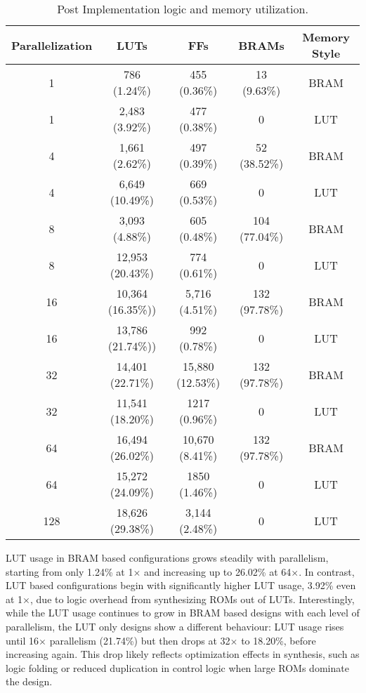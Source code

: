 \documentclass[a4paper,12pt]{report}
\begin{document}
\begin{table}[H]
\centering
\renewcommand{\arraystretch}{1.2}
\begin{tabular}{|c|c|c|c|c|}
\hline
\textbf{Parallelization} & \textbf{LUTs} & \textbf{FFs} & \textbf{BRAMs} & \textbf{Memory Style} \\
    \hline
    1   & 786 (1.24\%) & 455 (0.36\%) & 13 (9.63\%)  & BRAM \\
    \hline
    1   & 2,483 (3.92\%) & 477 (0.38\%) & 0  & LUT \\
    \hline
    4   & 1,661 (2.62\%)  & 497 (0.39\%)  & 52 (38.52\%)  & BRAM \\
    \hline
    4   & 6,649 (10.49\%)  & 669 (0.53\%)  & 0 & LUT \\
    \hline
    8   & 3,093 (4.88\%)  & 605 (0.48\%)  & 104 (77.04\%) & BRAM \\
    \hline
    8   & 12,953 (20.43\%)  & 774 (0.61\%)  & 0 & LUT \\
    \hline
    16  & 10,364 (16.35\%)) & 5,716 (4.51\%) & 132 (97.78\%)  & BRAM \\
    \hline
    16  & 13,786 (21.74\%)) & 992 (0.78\%) & 0  & LUT \\
    \hline
    32  & 14,401 (22.71\%) & 15,880 (12.53\%) & 132 (97.78\%) & BRAM \\
    \hline
    32  & 11,541 (18.20\%) & 1217 (0.96\%) & 0 & LUT \\
    \hline
    64  & 16,494 (26.02\%) & 10,670 (8.41\%) & 132 (97.78\%) & BRAM \\
    \hline
    64  & 15,272 (24.09\%) & 1850 (1.46\%) & 0 & LUT \\
    \hline
    128 & 18,626 (29.38\%) & 3,144 (2.48\%) & 0   & LUT \\
    \hline
\end{tabular}
\vspace{1em}
\caption{Post Implementation logic and memory utilization.}
\label{table:resource_utilization_comparison}
\end{table}

LUT usage in BRAM based configurations grows steadily with parallelism, starting from only 1.24\% at 1$\times$ and increasing up to 26.02\% at 64$\times$. In contrast, LUT based configurations begin with significantly higher LUT usage, 3.92\% even at 1$\times$, due to logic overhead from synthesizing ROMs out of LUTs. Interestingly, while the LUT usage continues to grow in BRAM based designs with each level of parallelism, the LUT only designs show a different behaviour: LUT usage rises until 16$\times$ parallelism (21.74\%) but then drops at 32$\times$ to 18.20\%, before increasing again. This drop likely reflects optimization effects in synthesis, such as logic folding or reduced duplication in control logic when large ROMs dominate the design.
\end{document}

